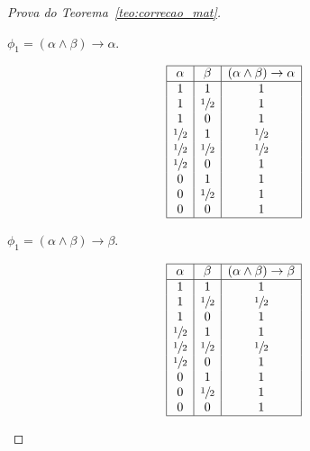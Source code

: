 \begin{proof}[Prova do Teorema~\ref{teo:correcao_mat}]
\begin{provaporcasos}
\begin{provaporsubcasos}
                   

                \subcasodeprova{} $\phi_{1} = (\alpha \land \beta) \to \alpha$. 


                \begin{center}
                    \[
                        \begin{array}{|c|c|c|}%
                            \hline
                            \alpha      & \beta & (\alpha \land \beta) \to \alpha \\
                            \hline%
                            1 & 1 &                 1\\
                            1 & \meio{} &1\\
                            1 & 0 &1\\
                            \meio{} & 1 &\meio{}\\
                            \meio{} & \meio{} &\meio{}\\
                            \meio{} & 0 &1\\
                            0 & 1 &1\\
                            0 & \meio{} &1\\
                            0 & 0 &1\\
                            \hline
                        \end{array}
                    \]
                \end{center}
                

                \subcasodeprova{} $\phi_{1} = (\alpha \land \beta) \to \beta$.

                \begin{center}
                    \[
                        \begin{array}{|c|c|c|}%
                            \hline
                            \alpha      & \beta & (\alpha \land \beta) \to \beta \\
                            \hline%
                            1 & 1 & 1\\
                            1 & \meio{} & \meio{}\\
                            1 & 0 & 1\\
                            \meio{} & 1 & 1\\
                            \meio{} & \meio{} & \meio{}\\
                            \meio{} & 0 & 1\\
                            0 & 1 & 1\\
                            0 & \meio{} & 1\\
                            0 & 0 & 1\\
                            \hline
                        \end{array}
                    \]
                \end{center}


\end{provaporsubcasos}
\end{provaporcasos}
\end{proof}
